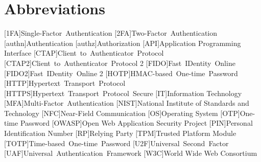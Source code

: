 \documentclass[twoside,twocolumn]{article}
\title{\mytitle} %
\author{%
  \textsc{Nils Siegle} \\[1ex] %
  \normalsize 3087271 \\ %
  \normalsize \href{mailto:nils.siegle@stud.uni-due.de}{nils.siegle@stud.uni-due.de} %
}
\date{\today} %
\begin{document}
\maketitle

\newpage
\onecolumn
\tableofcontents
\newpage


\section*{Abbreviations}
\begin{acronym}[AAAAAAA]
  [1FA]{Single-Factor Authentication}
  [2FA]{Two-Factor Authentication}
  [authn]{Authentication}
  [authz]{Authorization}
  [API]{Application Programming Interface}
  [CTAP]{Client to Authenticator Protocol}
  [CTAP2]{Client to Authenticator Protocol 2}
  [FIDO]{Fast IDentity Online}
  [FIDO2]{Fast IDentity Online 2}
  [HOTP]{HMAC-based One-time Password}
  [HTTP]{Hypertext Transport Protocol}
  [HTTPS]{Hypertext Transport Protocol Secure}
  [IT]{Information Technology}
  [MFA]{Multi-Factor Authentication}
  [NIST]{National Institute of Standards and Technology}
  [NFC]{Near-Field Communication}
  [OS]{Operating System}
  [OTP]{One-time Password}
  [OWASP]{Open Web Application Security Project}
  [PIN]{Personal Identification Number}
  [RP]{Relying Party}
  [TPM]{Trusted Platform Module}
  [TOTP]{Time-based One-time Password}
  [U2F]{Universal Second Factor}
  [UAF]{Universal Authentication Framework}
  [W3C]{World Wide Web Consortium}
\end{acronym}


\newpage
\twocolumn

\end{document}
